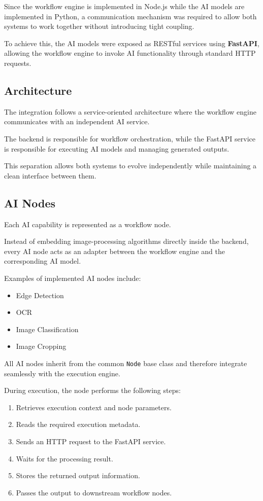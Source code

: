 Since the workflow engine is implemented in Node.js while the AI models are implemented in Python, a communication mechanism was required to allow both systems to work together without introducing tight coupling.

To achieve this, the AI models were exposed as RESTful services using \textbf{FastAPI}, allowing the workflow engine to invoke AI functionality through standard HTTP requests.


\subsection{Architecture}

The integration follows a service-oriented architecture where the workflow engine communicates with an independent AI service.

The backend is responsible for workflow orchestration, while the FastAPI service is responsible for executing AI models and managing generated outputs.

This separation allows both systems to evolve independently while maintaining a clean interface between them.


\subsection{AI Nodes}

Each AI capability is represented as a workflow node.

Instead of embedding image-processing algorithms directly inside the backend, every AI node acts as an adapter between the workflow engine and the corresponding AI model.

Examples of implemented AI nodes include:

\begin{itemize}
    \item Edge Detection
    \item OCR
    \item Image Classification
    \item Image Cropping
\end{itemize}

All AI nodes inherit from the common \texttt{Node} base class and therefore integrate seamlessly with the execution engine.

During execution, the node performs the following steps:

\begin{enumerate}
    \item Retrieves execution context and node parameters.
    \item Reads the required execution metadata.
    \item Sends an HTTP request to the FastAPI service.
    \item Waits for the processing result.
    \item Stores the returned output information.
    \item Passes the output to downstream workflow nodes.
\end{enumerate}

